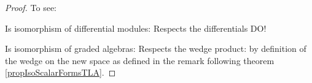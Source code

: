 \begin{proof}
To see:



Is isomorphism of differential modules: Respects the differentials DO!

Is isomorphism of graded algebras: Respects the wedge product: by definition of the wedge on the new space as defined in the remark following theorem \ref{propIsoScalarFormsTLA}.
\end{proof}







